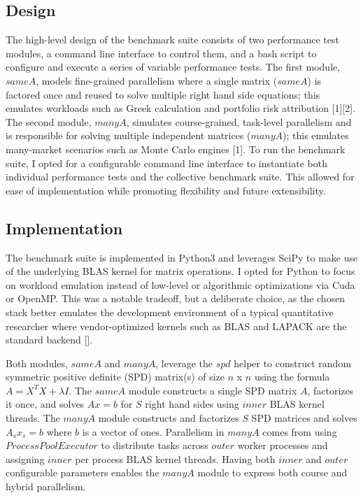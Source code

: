 \documentclass{article}
\begin{document}
\subsection{Design}
The high-level design of the benchmark suite consists of two performance test modules, a command line interface to control them, and a bash script to configure and execute a series of variable performance tests. The first module, $sameA$, models fine-grained parallelism where a single matrix ($sameA$) is factored once and reused to solve multiple right hand side equations; this emulates workloads such as Greek calculation and portfolio risk attribution [1][2]. The second module, $manyA$, simulates course-grained, task-level parallelism and is responsible for solving multiple independent matrices ($manyA$); this emulates many-market scenarios such as Monte Carlo engines [1]. To run the benchmark suite, I opted for a configurable command line interface to instantiate both individual performance tests and the collective benchmark suite. This allowed for ease of implementation while promoting flexibility and future extensibility. 


\subsection{Implementation}
The benchmark suite is implemented in Python3 and leverages SciPy to make use of the underlying BLAS kernel for matrix operations. I opted for Python to focus on workload emulation instead of low-level or algorithmic optimizations via Cuda or OpenMP. This was a notable tradeoff, but a deliberate choice, as the chosen stack better emulates the development environment of a typical quantitative researcher where vendor-optimized kernels such as BLAS and LAPACK are the standard backend []. 

Both modules, $sameA$ and $manyA$, leverage the $spd$ helper to construct random symmetric positive definite (SPD) matrix(s) of size $n$ x $n$ using the formula  $ A = X^{T} X + \lambda I$. The $sameA$ module constructs a single SPD matrix $A$, factorizes it once, and solves $A x = b$ for $S$ right hand sides using $inner$ BLAS kernel threads. The $manyA$ module constructs and factorizes $S$ SPD matrices and solves  $A_s x_s = b$ where $b$ is a vector of ones. Parallelism in $manyA$ comes from using $ProcessPoolExecutor$ to distribute tasks across $outer$ worker processes and assigning $inner$ per process BLAS kernel threads. Having both $inner$ and $outer$ configurable parameters enables the $manyA$ module to express both course and hybrid parallelism. 
\end{document}
